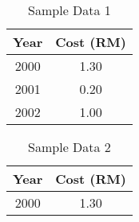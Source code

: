 \documentclass{article}
\begin{document}
\listoftables

\begin{table}[h]
    \begin{center}
        \begin{tabular}{|c|c|} \hline
            Year & Cost (RM)  \\
            \hline \hline
            2000 & 1.30 \\
            2001 & 0.20  \\
            2002 & 1.00  \\
            \hline
        \end{tabular}
    \end{center}
    \caption {Sample Data 1}
    \label{tab:TheCost}
\end{table}


\begin{table}[h]
    \begin{center}
        \begin{tabular}{|c|c|} \hline
            Year & Cost (RM)  \\
            \hline \hline
            2000 & 1.30 \\
            \hline
        \end{tabular}
    \end{center}
    \caption {Sample Data 2}
    \label{tab:TheCost}
\end{table}
\end{document}
